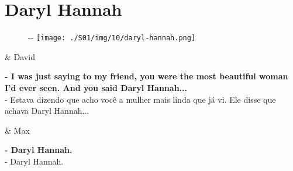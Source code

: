 \hypertarget{daryl-hannah}{%
\section{Daryl Hannah}\label{daryl-hannah}}

\begin{figure}[!ht]
  \begin{adjustwidth}{-\oddsidemargin-1in}{-\rightmargin}
    \centering
    \texttt{[image: ./S01/img/10/daryl-hannah.png]}
  \end{adjustwidth}
\end{figure}

\begin{tcolorbox}[enhanced,center upper,
    drop fuzzy shadow southeast, boxrule=0.3pt,
    lower separated=false, breakable,
    colframe=black!30!dialogoBorder,colback=white]
\begin{minipage}[c]{0.16\linewidth}
   & \centering \scriptsize{David}
\end{minipage}
\hfill
\begin{minipage}[c]{0.8\linewidth}
  \textbf{- I was just saying to my friend, you were the most beautiful woman I'd ever seen. And you said Daryl Hannah...}\\
  - Estava dizendo que acho você a mulher mais linda que já vi. Ele disse que achava Daryl Hannah...
\end{minipage}

\medskip
\begin{minipage}[c]{0.16\linewidth}
   & \centering \scriptsize{Max}
\end{minipage}
\hfill
\begin{minipage}[c]{0.8\linewidth}
  \textbf{- Daryl Hannah.}\\
  - Daryl Hannah.
\end{minipage}
\end{tcolorbox}

